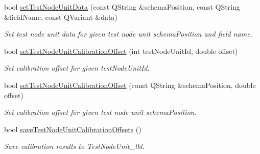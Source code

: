 \begin{DoxyCompactItemize}
bool \hyperlink{classmdt_tt_abstract_test_node_calibration_tool_a07f66a52481291172896b8bb6bf7d233}{set\-Test\-Node\-Unit\-Data} (const Q\-String \&schema\-Position, const Q\-String \&field\-Name, const Q\-Variant \&data)
\begin{DoxyCompactList}\small\item\em Set test node unit data for given test node unit schema\-Position and field name. \end{DoxyCompactList}\item 
bool \hyperlink{classmdt_tt_abstract_test_node_calibration_tool_a8b99adc8b660a48f8b86f82939cbe918}{set\-Test\-Node\-Unit\-Calibration\-Offset} (int test\-Node\-Unit\-Id, double offset)
\begin{DoxyCompactList}\small\item\em Set calibration offset for given test\-Node\-Unit\-Id. \end{DoxyCompactList}\item 
bool \hyperlink{classmdt_tt_abstract_test_node_calibration_tool_a3182718cb99cb4b7bac06c34688a7344}{set\-Test\-Node\-Unit\-Calibration\-Offset} (const Q\-String \&schema\-Position, double offset)
\begin{DoxyCompactList}\small\item\em Set calibration offset for given test node unit schema\-Position. \end{DoxyCompactList}\item 
bool \hyperlink{classmdt_tt_abstract_test_node_calibration_tool_a7c56f6b2ba4adf42fd51b520db5bb85b}{save\-Test\-Node\-Unit\-Calibration\-Offsets} ()
\begin{DoxyCompactList}\small\item\em Save calibration results to Test\-Node\-Unit\-\_\-tbl. \end{DoxyCompactList}\end{DoxyCompactItemize}
